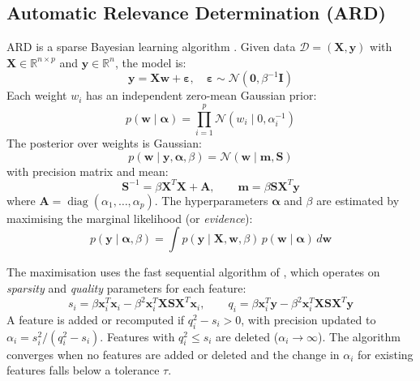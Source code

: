 \documentclass[11pt,a4paper]{article}
\begin{document}
\subsection{Automatic Relevance Determination (ARD)}

ARD is a sparse Bayesian learning algorithm \citep{tipping2003}. Given data $\mathcal{D} = (\mathbf{X}, \mathbf{y})$ with $\mathbf{X} \in \mathbb{R}^{n \times p}$ and $\mathbf{y} \in \mathbb{R}^n$, the model is:
\begin{equation}
\mathbf{y} = \mathbf{X}\mathbf{w} + \boldsymbol{\varepsilon}, \quad \boldsymbol{\varepsilon} \sim \mathcal{N}(\mathbf{0}, \beta^{-1}\mathbf{I})
\label{eq:likelihood}
\end{equation}
Each weight $w_i$ has an independent zero-mean Gaussian prior:
\begin{equation}
p(\mathbf{w} \mid \boldsymbol{\alpha}) = \prod_{i=1}^{p} \mathcal{N}(w_i \mid 0, \alpha_i^{-1})
\label{eq:prior}
\end{equation}
The posterior over weights is Gaussian:
\begin{equation}
p(\mathbf{w} \mid \mathbf{y}, \boldsymbol{\alpha}, \beta) = \mathcal{N}(\mathbf{w} \mid \mathbf{m}, \mathbf{S})
\label{eq:posterior}
\end{equation}
with precision matrix and mean:
\begin{equation}
\mathbf{S}^{-1} = \beta\mathbf{X}^T\mathbf{X} + \mathbf{A}, \qquad
\mathbf{m} = \beta \mathbf{S} \mathbf{X}^T \mathbf{y}
\label{eq:posterior_params}
\end{equation}
where $\mathbf{A} = \operatorname{diag}(\alpha_1,\dots,\alpha_p)$. The hyperparameters $\boldsymbol{\alpha}$ and $\beta$ are estimated by maximising the marginal likelihood (or \emph{evidence}):
\begin{equation}
p(\mathbf{y} \mid \boldsymbol{\alpha}, \beta) = \int p(\mathbf{y} \mid \mathbf{X}, \mathbf{w}, \beta) \, p(\mathbf{w} \mid \boldsymbol{\alpha}) \, d\mathbf{w}
\label{eq:marginal}
\end{equation}

The maximisation uses the fast sequential algorithm of \citet{tipping2003}, which operates on \emph{sparsity} and \emph{quality} parameters for each feature:
\begin{equation}
s_i = \beta \mathbf{x}_i^T \mathbf{x}_i - \beta^2 \mathbf{x}_i^T \mathbf{X} \mathbf{S} \mathbf{X}^T \mathbf{x}_i, \qquad
q_i = \beta \mathbf{x}_i^T \mathbf{y} - \beta^2 \mathbf{x}_i^T \mathbf{X} \mathbf{S} \mathbf{X}^T \mathbf{y}
\label{eq:sq}
\end{equation}
A feature is added or recomputed if $q_i^2 - s_i > 0$, with precision updated to $\alpha_i = s_i^2/(q_i^2 - s_i)$. Features with $q_i^2 \le s_i$ are deleted ($\alpha_i \to \infty$). The algorithm converges when no features are added or deleted and the change in $\alpha_i$ for existing features falls below a tolerance $\tau$.
\end{document}
